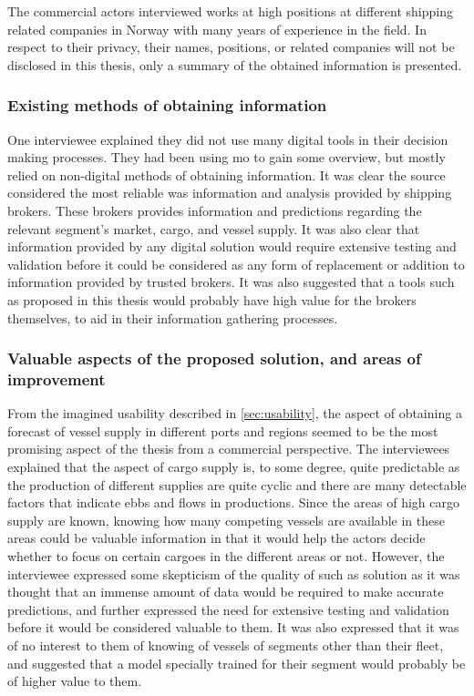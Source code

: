 The commercial actors interviewed works at high positions at different shipping related companies in Norway with many years of experience in the field. In respect to their privacy, their names, positions, or related companies will not be disclosed in this thesis, only a summary of the obtained information is presented.

\subsubsection{Existing methods of obtaining information}

One interviewee explained they did not use many digital tools in their decision making processes. They had been using \acrfull{mo} to gain some overview, but mostly relied on non-digital methods of obtaining information. It was clear the source considered the most reliable was information and analysis provided by shipping brokers. These brokers provides information and predictions regarding the relevant segment's market, cargo, and vessel supply. It was also clear that information provided by any digital solution would require extensive testing and validation before it could be considered as any form of replacement or addition to information provided by trusted brokers. It was also suggested that a tools such as proposed in this thesis would probably have high value for the brokers themselves, to aid in their information gathering processes.

\subsubsection{Valuable aspects of the proposed solution, and areas of improvement}

From the imagined usability described in \cref{sec:usability}, the aspect of obtaining a forecast of vessel supply in different ports and regions seemed to be the most promising aspect of the thesis from a commercial perspective. The interviewees explained that the aspect of cargo supply is, to some degree, quite predictable as the production of different supplies are quite cyclic and there are many detectable factors that indicate ebbs and flows in productions. Since the areas of high cargo supply are known, knowing how many competing vessels are available in these areas could be valuable information in that it would help the actors decide whether to focus on certain cargoes in the different areas or not. However, the interviewee expressed some skepticism of the quality of such as solution as it was thought that an immense amount of data would be required to make accurate predictions, and further expressed the need for extensive testing and validation before it would be considered valuable to them. It was also expressed that it was of no interest to them of knowing of vessels of segments other than their fleet, and suggested that a model specially trained for their segment would probably be of higher value to them.

